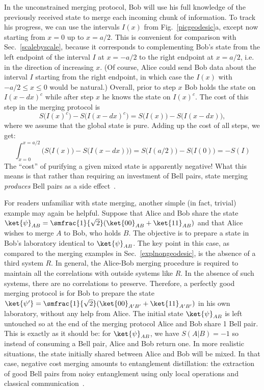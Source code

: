 \documentclass[12pt]{article}
\begin{document}
In the unconstrained merging protocol, Bob will use his full knowledge of the previously received state to merge each incoming chunk of information. To track his progress, we can use the intervals $I(x)$ from Fig.~\ref{picgeodesic}a, except now starting from $x=0$ up to $x = a/2$. This is convenient for comparison with Sec.~\ref{scalebyscale}, because it corresponds to complementing Bob's state from the left endpoint of the interval $I$ at $x = -a/2$ to the right endpoint at $x = a/2$, i.e. in the direction of increasing $x$. (Of course, Alice could send Bob data about the interval $I$ starting from the right endpoint, in which case the $I(x)$ with $-a/2 \leq x \leq 0$ would be natural.) Overall, prior to step $x$ Bob holds the state on $I(x-dx)^c$ while after step $x$ he knows the state on $I(x)^c$. The cost of this step in the merging protocol is
\begin{equation}
S\big(I(x)^c\big) - S\big(I(x-dx)^c\big) =  S\big(I(x)\big) - S\big(I(x-dx)\big),
\end{equation}
where we assume that the global state is pure. Adding up the cost of all steps, we get:
\begin{equation}
\int_{x = 0}^{x=a/2} \Big( S\big(I(x)\big) - S\big(I(x-dx)\big)\Big)  = S\big(I(a/2)\big) - S\big(I(0)\big) = -S(I)
\label{minusgeodlength}
\end{equation}
The ``cost'' of purifying a given mixed state is apparently negative! What this means is that rather than requiring an investment of Bell pairs, state merging \emph{produces} Bell pairs as a side effect~\cite{naturepaper}.

For readers unfamiliar with state merging, another simple (in fact, trivial) example may again be helpful. Suppose that Alice and Bob share the state $\ket{\psi}_{AB} = \smfrac{1}{\sqrt{2}}( \ket{00}_{AB} + \ket{11}_{AB})$ and that Alice wishes to merge $A$ to Bob, who holds $B$. The objective is to prepare a state in Bob's laboratory identical to $\ket{\psi}_{AB}$. The key point in this case, as compared to the merging examples in Sec.~\ref{explnongeodesic}, is the absence of a third system $R$. In general, the Alice-Bob merging procedure is required to maintain all the correlations with outside systems like $R$. In the absence of such systems, there are no correlations to preserve. Therefore, a perfectly good merging protocol is for Bob to prepare the state $\ket{\psi'} = \smfrac{1}{\sqrt{2}}(\ket{00}_{A'B'} + \ket{11}_{A'B'})$ in his own laboratory, without any help from Alice.  The initial state $\ket{\psi}_{AB}$ is left untouched so at the end of the merging protocol Alice and Bob share 1 Bell pair. This is exactly as it should be: for $\ket{\psi}_{AB}$, we have $S(A|B)=-1$ so instead of consuming a Bell pair, Alice and Bob return one. In more realistic situations, the state initially shared between Alice and Bob will be mixed. In that case, negative cost merging amounts to entanglement distillation: the extraction of good Bell pairs from noisy entanglement using only local operations and classical communication~\cite{bennett1996mixed,devetak2005distillation}.
\end{document}
